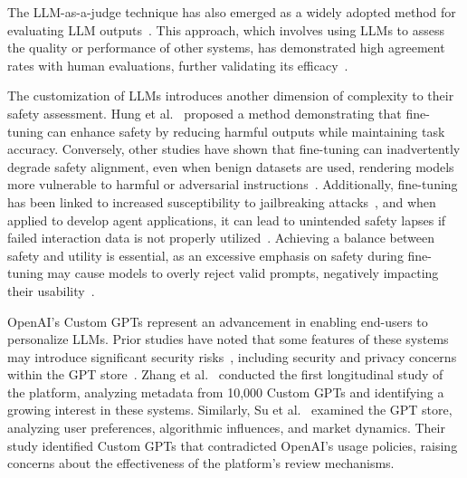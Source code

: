 The LLM-as-a-judge technique has also emerged as a widely adopted method for evaluating LLM outputs~\cite{huang2024empirical, li2025generation, gu2025surveyllmasajudge}. This approach, which involves using LLMs to assess the quality or performance of other systems, has demonstrated high agreement rates with human evaluations, further validating its efficacy~\cite{Zheng2023}.

The customization of LLMs introduces another dimension of complexity to their safety assessment. Hung et al.~\cite{huang2024lisa} proposed a method demonstrating that fine-tuning can enhance safety by reducing harmful outputs while maintaining task accuracy. Conversely, other studies have shown that fine-tuning can inadvertently degrade safety alignment, even when benign datasets are used, rendering models more vulnerable to harmful or adversarial instructions~\cite{qi2023finetuning}. Additionally, fine-tuning has been linked to increased susceptibility to jailbreaking attacks~\cite{kumar2024finetuning}, and when applied to develop agent applications, it can lead to unintended safety lapses if failed interaction data is not properly utilized~\cite{wang2024learningfailure}. Achieving a balance between safety and utility is essential, as an excessive emphasis on safety during fine-tuning may cause models to overly reject valid prompts, negatively impacting their usability~\cite{hsu2025safe}.

OpenAI’s Custom GPTs represent an advancement in enabling end-users to personalize LLMs. Prior studies have noted that some features of these systems may introduce significant security risks~\cite{antebi2024gptsheeps}, including security and privacy concerns within the GPT store~\cite{tao2023openingpandoras}. Zhang et al.~\cite{zhang2024lookgptappslandscape} conducted the first longitudinal study of the platform, analyzing metadata from 10,000 Custom GPTs and identifying a growing interest in these systems. Similarly, Su et al.~\cite{su2024gptstoremininganalysis} examined the GPT store, analyzing user preferences, algorithmic influences, and market dynamics. Their study identified Custom GPTs that contradicted OpenAI’s usage policies, raising concerns about the effectiveness of the platform’s review mechanisms.

